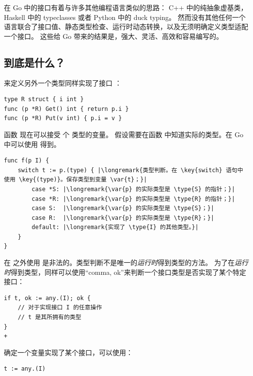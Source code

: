 在 Go 中的接口有着与许多其他编程语言类似的思路：
C++ 中的纯抽象虚基类，Haskell 中的 typeclasses 或者 Python 中的 duck typing。
然而没有其他任何一个语言联合了接口值、静态类型检查、运行时动态转换，以及无须明确定义类型适配一个接口。
这些给 Go 带来的结果是，强大、灵活、高效和容易编写的。

\subsection{到底是什么？}
来定义另外一个类型同样实现了接口 ：
\begin{lstlisting}[caption=实现了 I 的另一个类型]
type R struct { i int }
func (p *R) Get() int { return p.i }
func (p *R) Put(v int) { p.i = v }
\end{lstlisting}
函数  现在可以接受  个  类型的变量。
假设需要在函数  中知道实际的类型。在 Go 中可以使用
  得到。

\begin{lstlisting}
func f(p I) {
    switch t := p.(type) { |\longremark{类型判断。在 \key{switch} 语句中使用 \key{(type)}。保存类型到变量 \var{t}；}|
        case *S: |\longremark{\var{p} 的实际类型是 \type{S} 的指针；}|
        case *R: |\longremark{\var{p} 的实际类型是 \type{R} 的指针；}|
        case S:  |\longremark{\var{p} 的实际类型是 \type{S}；}|
        case R:  |\longremark{\var{p} 的实际类型是 \type{R}；}|
        default: |\longremark{实现了 \type{I} 的其他类型。}|
    }
}
\end{lstlisting}
\showremarks
在  之外使用  是非法的。类型判断不是唯一的\emph{运行时}得到类型的方法。
为了在\emph{运行时}得到类型，同样可以使用“comma, ok”来判断一个接口类型是否实现了某个特定接口：

\begin{lstlisting}
if t, ok := any.(I); ok { 
    // 对于实现接口 I 的任意操作
    // t 是其所拥有的类型
} 
+\end{lstlisting}
确定一个变量实现了某个接口，可以使用：
\begin{lstlisting}
t := any.(I)
\end{lstlisting}


